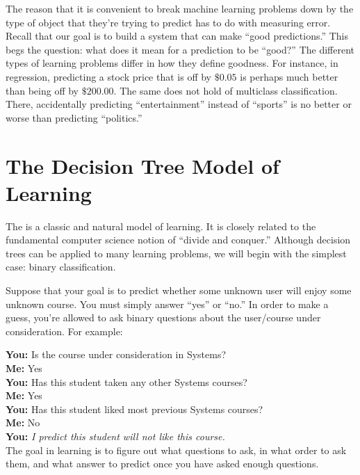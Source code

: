 
The reason that it is convenient to break machine learning problems
down by the type of object that they're trying to predict has to do
with measuring error.  Recall that our goal is to build a system that
can make ``good predictions.''  This begs the question: what does it
mean for a prediction to be ``good?''  The different types of learning
problems differ in how they define goodness.  For instance, in
regression, predicting a stock price that is off by $\$0.05$ is
perhaps much better than being off by $\$200.00$.  The same does not
hold of multiclass classification.  There, accidentally predicting
``entertainment'' instead of ``sports'' is no better or worse than
predicting ``politics.''


\section{The Decision Tree Model of Learning}

The  is a classic and natural model of
learning.  It is closely related to the fundamental computer science
notion of ``divide and conquer.''  Although decision trees can be
applied to many learning problems, we will begin with the simplest
case: binary classification.

Suppose that your goal is to predict whether some unknown user will
enjoy some unknown course.  You must simply answer ``yes'' or ``no.''
In order to make a guess, you're allowed to ask binary questions
about the user/course under consideration.  For example:

{\bf You:} Is the course under consideration in Systems?\\
{\bf Me:}  Yes\\
{\bf You:} Has this student taken any other Systems courses?\\
{\bf Me:}  Yes\\
{\bf You:} Has this student liked most previous Systems courses?\\
{\bf Me:}  No\\
{\bf You:} \emph{I predict this student will not like this course.}\\

The goal in learning is to figure out what questions to ask, in what
order to ask them, and what answer to predict once you have asked
enough questions.

